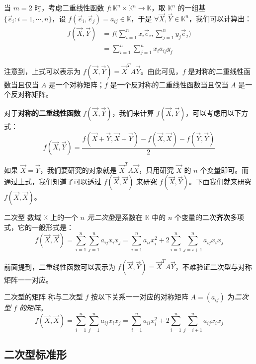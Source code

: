 \bigskip

当 $m = 2$ 时，考虑二重线性函数 $f \colon \mathbb K^n \times \mathbb K^n \to \mathbb K$，取 $\mathbb K^n$ 的一组基 $\{\vec e_i \colon i = 1, \cdots, n\}$，设 $f(\vec e_i, \vec e_j) = a_{ij} \in \mathbb K$，于是 $\forall \vec X, \vec Y \in \mathbb K^n$，我们可以计算出：
$$
\begin{aligned}
f(\vec X, \vec Y) &= f \biggl( \sum_{i = 1}^n x_i \vec e_i, \sum_{j = 1}^n y_j \vec e_j \biggr)
\\&=
\sum_{i = 1}^n \sum_{j = 1}^n x_i a_{ij} y_j
\end{aligned}
$$

注意到，上式可以表示为 $f(\vec X, \vec Y) = \vec X^T A \vec Y$。由此可见，$f$ 是对称的二重线性函数当且仅当 $A$ 是一个对称矩阵；$f$ 是一个反对称的二重线性函数当且仅当 $A$ 是一个反对称矩阵。

\bigskip

对于\textbf{对称的二重线性函数} $f(\vec X, \vec Y)$，我们来计算 $f(\vec X, \vec Y)$，可以考虑用以下方式：
$$
f(\vec X, \vec Y) = \frac{f(\vec X + \vec Y, \vec X + \vec Y) - f(\vec X, \vec X) - f(\vec Y, \vec Y)}{2}
$$

如果 $\vec X = \vec Y$，我们要研究的对象就是 $\vec X^T A \vec X$，只用研究 $\vec X$ 的 $n$ 个变量即可。而通过上式，我们知道了可以透过 $f(\vec X, \vec X)$ 来研究 $f(\vec X, \vec Y)$。下面我们就来研究 $f(\vec X, \vec X)$。

\begin{definition}{二次型}
	数域 $\mathbb K$ 上的一个 \emph{$n$ 元二次型}是系数在 $\mathbb K$ 中的 $n$ 个变量的二次\textbf{齐次}多项式，它的一般形式是：
	$$
	f(\vec X, \vec X) = \sum_{i = 1}^n \sum_{j = 1}^n a_{ij} x_i x_j = \sum_{i = 1}^n a_{ii} x_i^2 + 2 \sum_{i = 1}^n \sum_{j = i + 1}^n a_{ij} x_i x_j
	$$
\end{definition}

前面提到，二重线性函数可以表示为 $f(\vec X, \vec Y) = \vec X^T A \vec Y$，不难验证二次型与对称矩阵一一对应。

\begin{definition}{二次型的矩阵}
	称与二次型 $f$ 按以下关系一一对应的对称矩阵 $A = (a_{ij})$ 为\emph{二次型 $f$ 的矩阵}。
	$$
	f(\vec X, \vec X) = \sum_{i = 1}^n \sum_{j = 1}^n a_{ij} x_i x_j = \sum_{i = 1}^n a_{ii} x_i^2 + 2 \sum_{i = 1}^n \sum_{j = i + 1}^n a_{ij} x_i x_j
	$$
\end{definition}

\subsection{二次型标准形}

